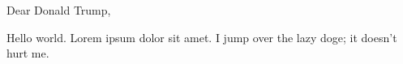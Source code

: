 \documentclass[a4paper,11pt]{article}
\begin{document}
\rmfamily
\chineseindenting


\noindent
Dear Donald Trump,
\vspace{1em}

Hello world. Lorem ipsum dolor sit amet.
I jump over the lazy doge; it doesn't hurt me.









\end{document}
